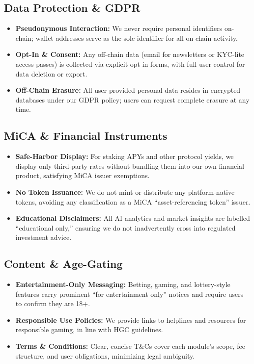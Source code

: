 \documentclass[13pt]{extarticle}
\begin{document}
\subsection{Data Protection \& GDPR}
\begin{itemize}[left=1em]
  \item \textbf{Pseudonymous Interaction:} We never require personal identifiers on-chain; wallet addresses serve as the sole identifier for all on-chain activity.
  \item \textbf{Opt-In \& Consent:} Any off-chain data (email for newsletters or KYC-lite access passes) is collected via explicit opt-in forms, with full user control for data deletion or export.
  \item \textbf{Off-Chain Erasure:} All user-provided personal data resides in encrypted databases under our GDPR policy; users can request complete erasure at any time.
\end{itemize}

\subsection{MiCA \& Financial Instruments}
\begin{itemize}[left=1em]
  \item \textbf{Safe-Harbor Display:} For staking APYs and other protocol yields, we display only third-party rates without bundling them into our own financial product, satisfying MiCA issuer exemptions.
  \item \textbf{No Token Issuance:} We do not mint or distribute any platform-native tokens, avoiding any classification as a MiCA “asset-referencing token” issuer.
  \item \textbf{Educational Disclaimers:} All AI analytics and market insights are labelled “educational only,” ensuring we do not inadvertently cross into regulated investment advice.
\end{itemize}

\subsection{Content \& Age-Gating}
\begin{itemize}[left=1em]
  \item \textbf{Entertainment-Only Messaging:} Betting, gaming, and lottery-style features carry prominent “for entertainment only” notices and require users to confirm they are 18+.
  \item \textbf{Responsible Use Policies:} We provide links to helplines and resources for responsible gaming, in line with HGC guidelines.
  \item \textbf{Terms \& Conditions:} Clear, concise T\&Cs cover each module’s scope, fee structure, and user obligations, minimizing legal ambiguity.
\end{itemize}
\end{document}

